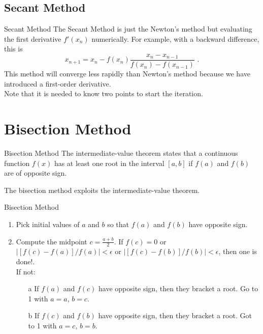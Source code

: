 \documentclass[11pt]{beamer}
\begin{document}
\subsection{Secant Method}
\begin{frame}[fragile]{Secant Method}
The Secant Method is just the Newton's method but evaluating the first derivative $f'(x_n)$ numerically. 
For example, with a backward difference, this is
\begin{equation}
x_{n+1} = x_{n} - f(x_n)\frac{x_n - x_{n-1}}{f(x_n) - f(x_{n-1})}\,\,.
\end{equation}
This method will converge less rapidly than Newton's
method because we have introduced a first-order derivative. \\
Note that it is needed to know two points to start the iteration.
\end{frame}

\section{Bisection Method}
\begin{frame}[fragile]{Bisection Method}
The intermediate-value theorem states that a continuous function
$f(x)$ has at least one root in the interval $[a,b]$ if $f(a)$ and
$f(b)$ are of opposite sign.\\
\bigskip

The bisection method exploits the intermediate-value theorem. 
\end{frame}

\begin{frame}[fragile]{Bisection Method}
\begin{enumerate}
\item Pick initial values of $a$ and $b$ so that $f(a)$ and $f(b)$
  have opposite sign.
\item Compute the midpoint $c = \frac{a+b}{2}$. If $f(c) = 0$ or
  $|[f(c) - f(a)]/f(a)| < \epsilon$ or $|[f(c) - f(b)]/f(b)| <
  \epsilon$, then one is done!.\\
  
  If not:
  \begin{enumerate}
    \item[a] If $f(a)$ and $f(c)$ have opposite sign, then they
      bracket a root. Go to 1 with $a=a$, $b=c$.
    \item[b] If $f(c)$ and $f(b)$ have opposite sign, then they
      bracket a root. Got to 1 with $a=c$, $b=b$.
  \end{enumerate}
  
\end{enumerate}
\end{frame}
\end{document}
